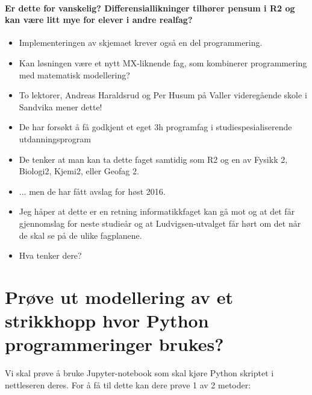 \documentclass[%
oneside,                 %
final,                   %
10pt,norsk]{article}
\begin{document}
\noindent

\paragraph{Er dette for vanskelig? Differensiallikninger tilhører pensum i R2 og kan være litt mye for elever i andre realfag?}
\begin{itemize}
\item Implementeringen av skjemaet krever også en del programmering.
\end{itemize}

\noindent
\begin{itemize}
\item Kan løsningen være et nytt MX-liknende fag, som kombinerer programmering med matematisk modellering?

\item To lektorer, Andreas Haraldsrud og Per Husum på Valler videregående skole i Sandvika mener dette!

\item De har forsøkt å få godkjent et eget 3h programfag i studiespesialiserende utdanningsprogram

\item De tenker at man kan ta dette faget samtidig som R2 og en av Fysikk 2, Biologi2, Kjemi2, eller Geofag 2.

\item ... men de har fått avslag for høst 2016.

\item Jeg håper at dette er en retning informatikkfaget kan gå mot og at det får gjennomslag for neste studieår og at Ludvigsen-utvalget får hørt om det når de skal se på de ulike fagplanene.

\item Hva tenker dere?
\end{itemize}

\noindent


\section*{Prøve ut modellering av et strikkhopp hvor Python programmeringer brukes?}

Vi skal prøve å bruke Jupyter-notebook som skal kjøre Python skriptet i nettleseren deres. For å få til dette kan dere prøve 1 av 2 metoder:
\end{document}
